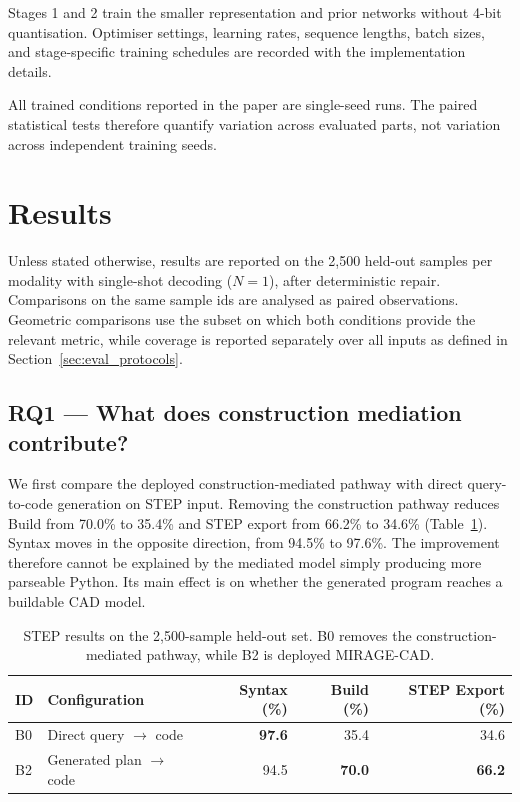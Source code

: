 \documentclass[preprint,12pt]{elsarticle}
\begin{document}
Stages 1 and 2 train the smaller representation and prior networks without
4-bit quantisation. Optimiser settings, learning rates, sequence lengths,
batch sizes, and stage-specific training schedules are recorded with the
implementation details.

All trained conditions reported in the paper are single-seed runs. The paired
statistical tests therefore quantify variation across evaluated parts, not
variation across independent training seeds.


\section{Results}
\label{sec:results}

Unless stated otherwise, results are reported on the 2,500 held-out samples
per modality with single-shot decoding ($N=1$), after deterministic repair.
Comparisons on the same sample ids are analysed as paired observations.
Geometric comparisons use the subset on which both conditions provide the
relevant metric, while coverage is reported separately over all inputs as
defined in Section~\ref{sec:eval_protocols}.


\subsection{RQ1 --- What does construction mediation contribute?}
\label{sec:rq1}

We first compare the deployed construction-mediated pathway with direct
query-to-code generation on STEP input. Removing the construction pathway
reduces Build from 70.0\% to 35.4\% and STEP export from 66.2\% to 34.6\%
(Table~\ref{tab:main}). Syntax moves in the opposite direction, from 94.5\%
to 97.6\%. The improvement therefore cannot be explained by the mediated
model simply producing more parseable Python. Its main effect is on whether
the generated program reaches a buildable CAD model.

\begin{table}[htbp]
  \centering
  \footnotesize
  \caption{STEP results on the 2,500-sample held-out set. B0 removes the
    construction-mediated pathway, while B2 is deployed MIRAGE-CAD.}
  \label{tab:main}
  \begin{tabular}{llrrr}
    \toprule
    ID & Configuration                     & Syntax (\%)   & Build (\%)    & STEP Export (\%) \\
    \midrule
    B0 & Direct query $\rightarrow$ code
       & \textbf{97.6}                     & 35.4          & 34.6                             \\
    B2 & Generated plan $\rightarrow$ code
       & 94.5                              & \textbf{70.0} & \textbf{66.2}                    \\
    \bottomrule
  \end{tabular}
\end{table}
\end{document}
